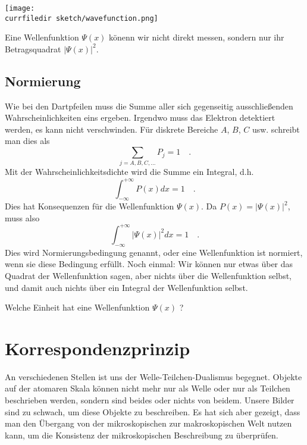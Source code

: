 \begin{marginfigure}
    \texttt{[image: \\currfiledir sketch/wavefunction.png]}
    \caption{Eine Wellenfunktion $\Psi(x)$ könenn wir nicht direkt messen, sondern nur ihr Betragsquadrat $|\Psi(x)|^2$.}
\end{marginfigure}



\subsection{Normierung}

Wie bei den Dartpfeilen muss die Summe aller sich gegenseitig ausschließenden Wahrscheinlichkeiten eins ergeben. Irgendwo muss das Elektron detektiert werden, es kann nicht verschwinden. Für diskrete Bereiche $A$, $B$, $C$ usw. schreibt man dies als
\begin{equation}
    \sum_{j = A, B, C, \dots} P_j = 1 \quad .
\end{equation}
Mit der Wahrscheinlichkeitsdichte wird die Summe ein Integral, d.h.
\begin{equation}
    \int_{-\infty}^{+\infty} P(x) dx = 1 \quad .
\end{equation}
Dies hat Konsequenzen für die Wellenfunktion $\Psi(x)$. Da $P(x) = |\Psi(x)|^2$, muss also 
\begin{equation}
    \int_{-\infty}^{+\infty} |\Psi(x)|^2 dx = 1 \quad .
\end{equation}
Dies wird Normierungsbedingung genannt, oder eine Wellenfunktion ist normiert, wenn sie diese Bedingung erfüllt. Noch einmal: Wir können nur etwas über das Quadrat der Wellenfunktion sagen, aber nichts über die Wellenfunktion selbst, und damit auch nichts über ein Integral der Wellenfunktion selbst.

\begin{questions}
    \item Welche Einheit hat eine Wellenfunktion $\Psi(x)$ ?
\end{questions}


\section{Korrespondenzprinzip}
An verschiedenen Stellen ist uns der Welle-Teilchen-Dualismus begegnet. Objekte auf der atomaren Skala können nicht mehr nur als Welle oder nur als Teilchen beschrieben werden, sondern sind beides oder nichts von beidem. Unsere Bilder sind zu schwach, um diese Objekte zu beschreiben. Es hat sich aber gezeigt, dass man den Übergang von der mikroskopischen zur makroskopischen Welt nutzen kann, um die Konsistenz der mikroskopischen Beschreibung zu überprüfen. 

